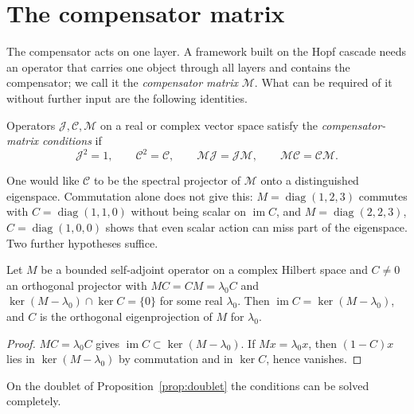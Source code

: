 \section{The compensator matrix}\label{sec:cm}

The compensator acts on one layer.  A framework built on the Hopf cascade needs an operator that carries one object through all layers
and contains the compensator; we call it the \emph{compensator matrix} \(\mathcal M\).  What can be required of it without further input are
the following identities.

\begin{definition}\label{def:cm}
Operators \(\mathcal J,\mathcal C,\mathcal M\) on a real or complex vector space satisfy the \emph{compensator-matrix conditions} if
\begin{equation}\label{eq:cm}
\mathcal J^2=1,\qquad \mathcal C^2=\mathcal C,\qquad
\mathcal M\mathcal J=\mathcal J\mathcal M,\qquad \mathcal M\mathcal C=\mathcal C\mathcal M .
\end{equation}
\end{definition}

One would like \(\mathcal C\) to be the spectral projector of \(\mathcal M\) onto a distinguished eigenspace.  Commutation alone does not give
this: \(M=\operatorname{diag}(1,2,3)\) commutes with \(C=\operatorname{diag}(1,1,0)\) without being scalar on \(\operatorname{im}C\), and
\(M=\operatorname{diag}(2,2,3)\), \(C=\operatorname{diag}(1,0,0)\) shows that even scalar action can miss part of the eigenspace.  Two further
hypotheses suffice.

\begin{proposition}\label{prop:spectral}
Let \(M\) be a bounded self-adjoint operator on a complex Hilbert space and \(C\neq0\) an orthogonal projector with
\(MC=CM=\lambda_0C\) and \(\ker(M-\lambda_0)\cap\ker C=\{0\}\) for some real \(\lambda_0\).  Then \(\operatorname{im}C=\ker(M-\lambda_0)\), and \(C\)
is the orthogonal eigenprojection of \(M\) for \(\lambda_0\).
\end{proposition}

\begin{proof}
\(MC=\lambda_0C\) gives \(\operatorname{im}C\subset\ker(M-\lambda_0)\).  If \(Mx=\lambda_0x\), then \((1-C)x\) lies in \(\ker(M-\lambda_0)\) by commutation
and in \(\ker C\), hence vanishes.
\end{proof}

On the doublet of Proposition~\ref{prop:doublet} the conditions can be solved completely.

